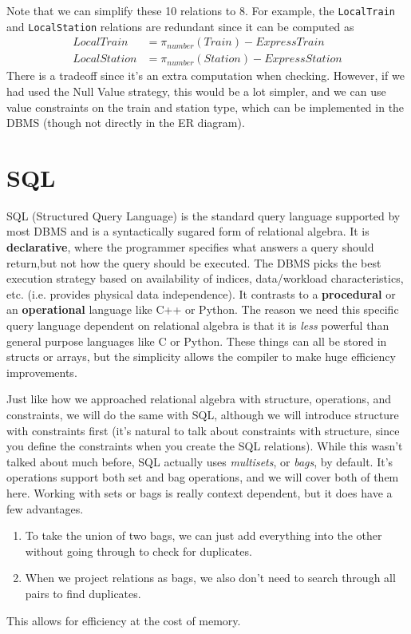 \documentclass{article}
\begin{document}
\begin{example}
\begin{enumerate}
      \end{enumerate}
      Note that we can simplify these 10 relations to 8. For example, the \texttt{LocalTrain} and \texttt{LocalStation} relations are redundant since it can be computed as 
      \begin{align}
        LocalTrain & = \pi_{number} (Train) - ExpressTrain \\
        LocalStation & = \pi_{number} (Station) - ExpressStation
      \end{align}
      There is a tradeoff since it's an extra computation when checking. However, if we had used the Null Value strategy, this would be a lot simpler, and we can use value constraints on the train and station type, which can be implemented in the DBMS (though not directly in the ER diagram). 
    \end{example}

\section{SQL} 

    SQL (Structured Query Language) is the standard query language supported by most DBMS and is a syntactically sugared form of relational algebra. It is \textbf{declarative}, where the programmer specifies what answers a query should return,but not how the query should be executed. The DBMS picks the best execution strategy based on availability of indices, data/workload characteristics, etc. (i.e. provides physical data independence). It contrasts to a \textbf{procedural} or an \textbf{operational} language like C++ or Python. The reason we need this specific query language dependent on relational algebra is that it is \textit{less} powerful than general purpose languages like C or Python. These things can all be stored in structs or arrays, but the simplicity allows the compiler to make huge efficiency improvements. 

    Just like how we approached relational algebra with structure, operations, and constraints, we will do the same with SQL, although we will introduce structure with constraints first (it's natural to talk about constraints with structure, since you define the constraints when you create the SQL relations). While this wasn't talked about much before, SQL actually uses \textit{multisets}, or \textit{bags}, by default. It's operations support both set and bag operations, and we will cover both of them here. Working with sets or bags is really context dependent, but it does have a few advantages. 
    \begin{enumerate}
      \item To take the union of two bags, we can just add everything into the other without going through to check for duplicates. 
      \item When we project relations as bags, we also don't need to search through all pairs to find duplicates. 
    \end{enumerate}
    This allows for efficiency at the cost of memory. 
\end{document}
